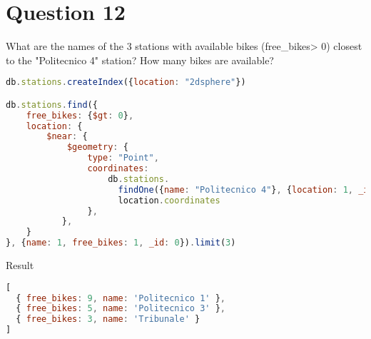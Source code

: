 \section{Question 12}

\begin{question}
  What are the names of the 3 stations with available bikes (free_bikes> 0)
  closest to the "Politecnico 4" station? How many bikes are available?
\end{question}

\begin{answer}

  \begin{lstlisting}[language=js]
db.stations.createIndex({location: "2dsphere"})

db.stations.find({
    free_bikes: {$gt: 0},
    location: {
        $near: {
            $geometry: {
                type: "Point",
                coordinates:
                    db.stations.
                      findOne({name: "Politecnico 4"}, {location: 1, _id: 0}).
                      location.coordinates
                },
           },
    }
}, {name: 1, free_bikes: 1, _id: 0}).limit(3)

  \end{lstlisting}
  Result
  \begin{lstlisting}[language=js]
[
  { free_bikes: 9, name: 'Politecnico 1' },
  { free_bikes: 5, name: 'Politecnico 3' },
  { free_bikes: 3, name: 'Tribunale' }
]
  \end{lstlisting}

\end{answer}
